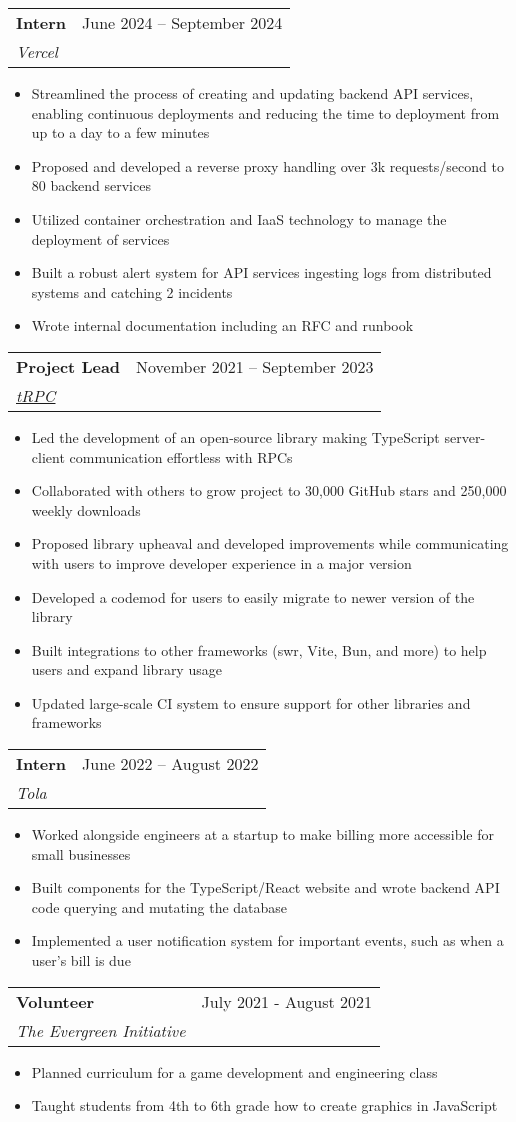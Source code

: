 \documentclass[letterpaper,11pt]{article}
\makeatletter
\newcommand{\resumeItem}[1]{
  \item\small{
    {#1 \vspace{-2pt}}
  }
}
\newcommand{\resumeSubheading}[3]{
  \vspace{-2pt}\item
    \begin{tabular*}{0.97\textwidth}[t]{l@{\extracolsep{\fill}}r}
      \textbf{#1} & #2 \\
      \textit{\small#3} \\
    \end{tabular*}\vspace{-7pt}
}
\newcommand{\resumeItemListStart}{\begin{itemize}}
\newcommand{\resumeItemListEnd}{\end{itemize}\vspace{-5pt}}
\makeatother
\begin{document}
    \resumeSubheading
      {Intern}{June 2024 -- September 2024}
      {Vercel}
      \resumeItemListStart
        \resumeItem{Streamlined the process of creating and updating backend API services, enabling continuous deployments and reducing the time to deployment from up to a day to a few minutes}
        \resumeItem{Proposed and developed a reverse proxy handling over 3k requests/second to 80 backend services}
        \resumeItem{Utilized container orchestration and IaaS technology to manage the deployment of services}
        \resumeItem{Built a robust alert system for API services ingesting logs from distributed systems and catching 2 incidents}
        \resumeItem{Wrote internal documentation including an RFC and runbook}
      \resumeItemListEnd
      
    \resumeSubheading
      {Project Lead}{November 2021 -- September 2023}
      {\href{https://github.com/trpc/trpc}{\underline{tRPC}}}
      \resumeItemListStart
        \resumeItem{Led the development of an open-source library making TypeScript server-client communication effortless with RPCs}
        \resumeItem{Collaborated with others to grow project to 30,000 GitHub stars and 250,000 weekly downloads}
        \resumeItem{Proposed library upheaval and developed improvements while communicating with users to improve developer experience in a major version}
        \resumeItem{Developed a codemod for users to easily migrate to newer version of the library}
        \resumeItem{Built integrations to other frameworks (swr, Vite, Bun, and more) to help users and expand library usage}
        \resumeItem{Updated large-scale CI system to ensure support for other libraries and frameworks}
      \resumeItemListEnd

    \resumeSubheading
      {Intern}{June 2022 -- August 2022}
      {Tola}
      \resumeItemListStart
        \resumeItem{Worked alongside engineers at a startup to make billing more accessible for small businesses}
        \resumeItem{Built components for the TypeScript/React website and wrote backend API code querying and mutating the database}
        \resumeItem{Implemented a user notification system for important events, such as when a user's bill is due}
      \resumeItemListEnd

    \resumeSubheading
      {Volunteer}{July 2021 - August 2021}
      {The Evergreen Initiative}
      \resumeItemListStart
        \resumeItem{Planned curriculum for a game development and engineering class}
        \resumeItem{Taught students from 4th to 6th grade how to create graphics in JavaScript}
      \resumeItemListEnd
\end{document}
